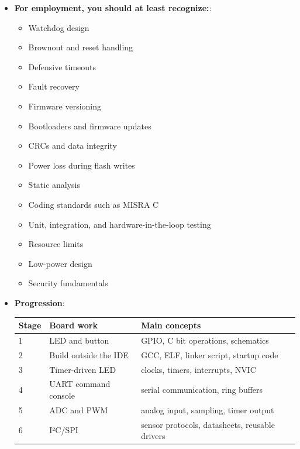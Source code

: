 \documentclass{report}
\begin{document}
\begin{itemize}
\begin{itemize}
            \end{itemize}
        \item \textbf{For employment, you should at least recognize:}: 
            \begin{itemize}
                \item Watchdog design
                \item Brownout and reset handling
                \item Defensive timeouts
                \item Fault recovery
                \item Firmware versioning
                \item Bootloaders and firmware updates
                \item CRCs and data integrity
                \item Power loss during flash writes
                \item Static analysis
                \item Coding standards such as MISRA C
                \item Unit, integration, and hardware-in-the-loop testing
                \item Resource limits
                \item Low-power design
                \item Security fundamentals
            \end{itemize}
        \item \textbf{Progression}: 
            \begin{center}
                \begin{tabularx}{\textwidth}{@{}lXX@{}}
                    \toprule
                    \textbf{Stage}&	\textbf{Board work}&	\textbf{Main concepts} \\
                    \midrule
                    1	&LED and button	&GPIO, C bit operations, schematics\\[2ex]
                    2	&Build outside the IDE	&GCC, ELF, linker script, startup code\\[2ex]
                    3	&Timer-driven LED	&clocks, timers, interrupts, NVIC\\[2ex]
                    4	&UART command console	&serial communication, ring buffers\\[2ex]
                    5	&ADC and PWM	&analog input, sampling, timer output\\[2ex]
                    6	&I²C/SPI &sensor	protocols, datasheets, reusable drivers\\[2ex]

\end{tabularx}
\end{center}
\end{itemize}
\end{document}

